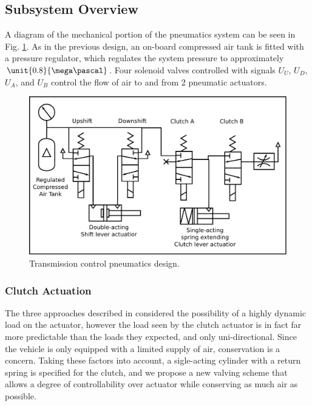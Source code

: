 \subsection{Subsystem Overview}

A diagram of the mechanical portion of the pneumatics system can be seen in Fig. \ref{fig:pneumatics_design}. As in the previous design, an on-board compressed air tank is fitted with a pressure regulator, which regulates the system pressure to approximately $\unit{0.8}{\mega\pascal}$. Four solenoid valves controlled with signals $U_U$, $U_D$, $U_A$, and $U_B$ control the flow of air to and from 2 pneumatic actuators.

\begin{figure}[H]
\centering
\includegraphics[scale=0.5]{design/figures/pneumatics}
\caption{Transmission control pneumatics design.}
\label{fig:pneumatics_design}
\end{figure}

\subsubsection{Clutch Actuation}

The three approaches described in \cite{pneumatic_actuator, adaptive_pneumatic, accurate_position} considered the possibility of a highly dynamic load on the actuator, however the load seen by the clutch actuator is in fact far more predictable than the loads they expected, and only uni-directional. Since the vehicle is only equipped with a limited supply of air, conservation is a concern. Taking these factors into account, a sigle-acting cylinder with a return spring is specified for the clutch, and we propose a new valving scheme  that allows a degree of controllability over actuator while conserving as much air as possible.

